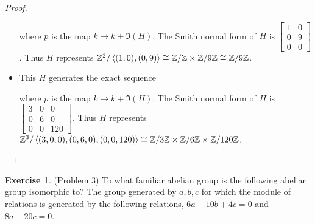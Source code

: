 \documentclass[12pt, psamsfonts]{amsart}
\theoremstyle{definition}
\newtheorem*{exer}{Exercise}
\theoremstyle{remark}
\numberwithin{equation}{section}
\begin{document}
\begin{proof}
\begin{itemize}
      \begin{center}
      \end{center}

      where $p$ is the map $k \mapsto k + \Im(H)$.
      The Smith normal form of $H$ is $\begin{bmatrix} 1 & 0 \\ 0 & 9 \\ 0 & 0 \end{bmatrix}$.
      Thus $H$ represents $\mathbb{Z}^2/\ev{(1, 0), (0, 9)} \cong \mathbb{Z}/\mathbb{Z} \times \mathbb{Z}/9\mathbb{Z} \cong \mathbb{Z}/9\mathbb{Z}$.
    \item
      This $H$ generates the exact sequence

      \begin{center}
      \end{center}

      where $p$ is the map $k \mapsto k + \Im(H)$.
      The Smith normal form of $H$ is $\begin{bmatrix} 3 & 0 & 0 \\ 0 & 6 & 0 \\ 0 & 0 & 120 \end{bmatrix}$.
      Thus $H$ represents $\mathbb{Z}^3/\ev{(3, 0, 0), (0, 6, 0), (0, 0, 120)} \cong \mathbb{Z}/3\mathbb{Z} \times \mathbb{Z}/6\mathbb{Z} \times \mathbb{Z}/120\mathbb{Z}$.
  \end{itemize}
\end{proof}

\begin{exer}{(Problem 3)}
  To what familiar abelian group is the following abelian group isomorphic to?
  The group generated by $a, b, c$ for which the module of relations is generated by the following relations, $6a - 10b + 4c = 0$ and $8a - 20c = 0$.
\end{exer}
\end{document}
